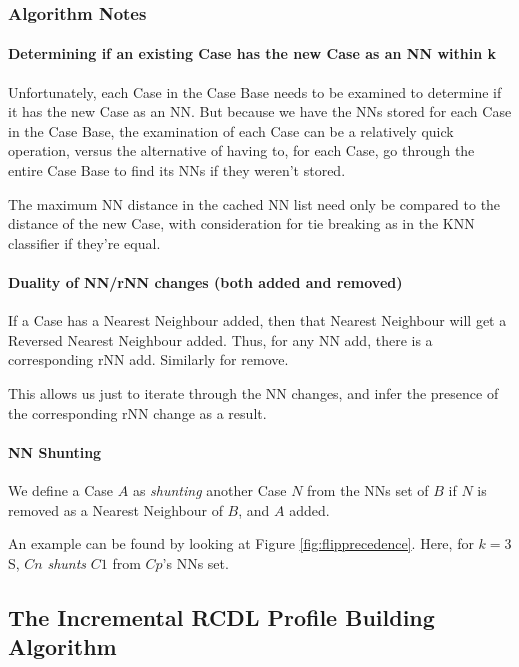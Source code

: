 \documentclass[a4paper,11pt]{report}
\begin{document}
\subsubsection{Algorithm Notes}
\paragraph{Determining if an existing Case has the new Case as an NN within k}
Unfortunately, each Case in the Case Base needs to be examined to determine if it has the new Case as an NN. But because we have the NNs stored for each Case in the Case Base, the examination of each Case can be a relatively quick operation, versus the alternative of having to, for each Case, go through the entire Case Base to find its NNs if they weren't stored.

The maximum NN distance in the cached NN list need only be compared to the distance of the new Case, with consideration for tie breaking as in the KNN classifier if they're equal.

\paragraph{Duality of NN/rNN changes (both added and removed)}
If a Case has a Nearest Neighbour added, then that Nearest Neighbour will get a Reversed Nearest Neighbour added. Thus, for any NN add, there is a corresponding rNN add. Similarly for remove.

This allows us just to iterate through the NN changes, and infer the presence of the corresponding rNN change as a result.

\paragraph{NN Shunting}
We define a Case $A$ as \emph{shunting} another Case $N$ from the NNs set of $B$ if $N$ is removed as a Nearest Neighbour of $B$, and $A$ added.

An example can be found by looking at Figure \ref{fig:flipprecedence}. Here, for $k=3$S, $Cn$ \emph{shunts} $C1$ from $Cp$'s NNs set.

\subsection{The Incremental RCDL Profile Building Algorithm}
\end{document}

